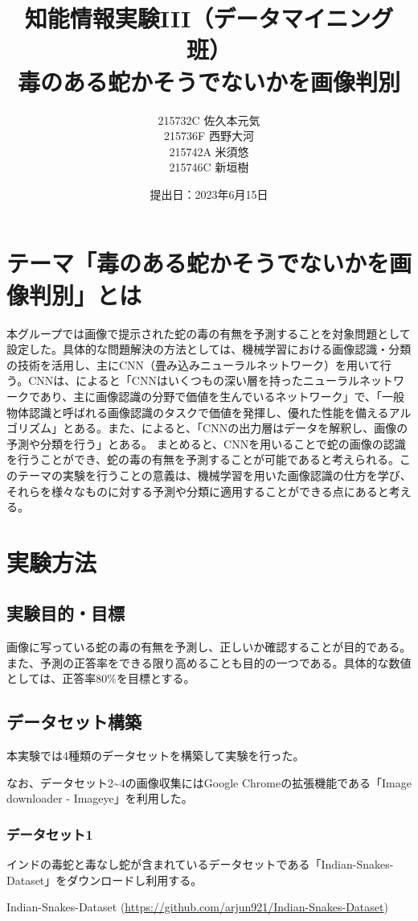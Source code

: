 \documentclass[a4paper, 11pt, titlepage]{jsarticle}
\title{知能情報実験III（データマイニング班）\\毒のある蛇かそうでないかを画像判別}
\author{215732C 佐久本元気\\215736F 西野大河\\215742A 米須悠\\215746C 新垣樹\\}
\date{提出日：2023年6月15日}
\begin{document}
\maketitle
\tableofcontents
\clearpage

\section{テーマ「毒のある蛇かそうでないかを画像判別」とは}
本グループでは画像で提示された蛇の毒の有無を予測することを対象問題として設定した。具体的な問題解決の方法としては、機械学習における画像認識・分類の技術を活用し、主にCNN（畳み込みニューラルネットワーク）を用いて行う。CNNは、\cite{theme1}によると「CNNはいくつもの深い層を持ったニューラルネットワークであり、主に画像認識の分野で価値を生んでいるネットワーク」で、「一般物体認識と呼ばれる画像認識のタスクで価値を発揮し、優れた性能を備えるアルゴリズム」とある。また、\cite{theme2}によると、「CNNの出力層はデータを解釈し、画像の予測や分類を行う」とある。
まとめると、CNNを用いることで蛇の画像の認識を行うことができ、蛇の毒の有無を予測することが可能であると考えられる。このテーマの実験を行うことの意義は、機械学習を用いた画像認識の仕方を学び、それらを様々なものに対する予測や分類に適用することができる点にあると考える。

\section{実験方法}
\subsection{実験目的・目標}
画像に写っている蛇の毒の有無を予測し、正しいか確認することが目的である。また、予測の正答率をできる限り高めることも目的の一つである。具体的な数値としては、正答率80\%を目標とする。

\subsection{データセット構築}
本実験では4種類のデータセットを構築して実験を行った。\par
なお、データセット2\textasciitilde4の画像収集にはGoogle Chromeの拡張機能である「Image downloader - Imageye」を利用した。\par
\subsubsection{データセット1}
インドの毒蛇と毒なし蛇が含まれているデータセットである「Indian-Snakes-Dataset」をダウンロードし利用する。\par
Indian-Snakes-Dataset  (\url{https://github.com/arjun921/Indian-Snakes-Dataset}) \par
\end{document}
